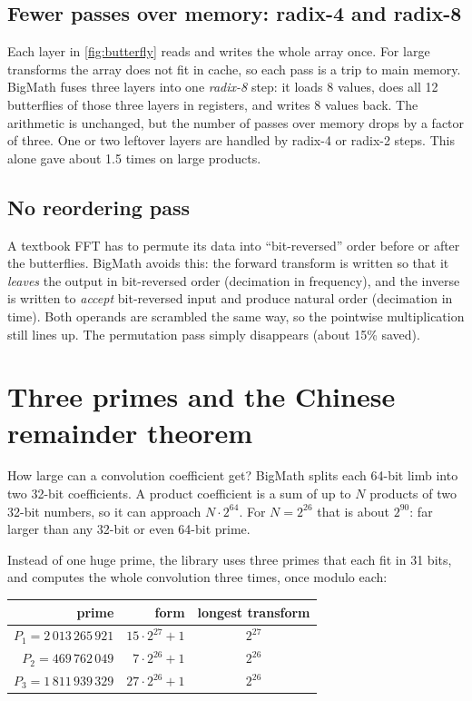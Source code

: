 \subsection{Fewer passes over memory: radix-4 and radix-8}

Each layer in \cref{fig:butterfly} reads and writes the whole array once. For large
transforms the array does not fit in cache, so each pass is a trip to main memory.
BigMath fuses three layers into one \emph{radix-8} step: it loads 8 values, does all 12
butterflies of those three layers in registers, and writes 8 values back. The arithmetic
is unchanged, but the number of passes over memory drops by a factor of three. One or two
leftover layers are handled by radix-4 or radix-2 steps. This alone gave about 1.5 times
on large products.

\subsection{No reordering pass}

A textbook FFT has to permute its data into ``bit-reversed'' order before or after the
butterflies. BigMath avoids this: the forward transform is written so that it
\emph{leaves} the output in bit-reversed order (decimation in frequency), and the inverse
is written to \emph{accept} bit-reversed input and produce natural order (decimation in
time). Both operands are scrambled the same way, so the pointwise multiplication still
lines up. The permutation pass simply disappears (about 15\% saved).

\section{Three primes and the Chinese remainder theorem}
\label{sec:crt}

How large can a convolution coefficient get? BigMath splits each 64-bit limb into two
32-bit coefficients. A product coefficient is a sum of up to $N$ products of two 32-bit
numbers, so it can approach $N \cdot 2^{64}$. For $N = 2^{26}$ that is about $2^{90}$: far
larger than any 32-bit or even 64-bit prime.

Instead of one huge prime, the library uses three primes that each fit in 31 bits, and
computes the whole convolution three times, once modulo each:

\begin{center}
\begin{tabular}{rrc}
\toprule
prime & form & longest transform \\
\midrule
$P_1 = 2\,013\,265\,921$ & $15 \cdot 2^{27} + 1$ & $2^{27}$ \\
$P_2 = 469\,762\,049$ & $7 \cdot 2^{26} + 1$ & $2^{26}$ \\
$P_3 = 1\,811\,939\,329$ & $27 \cdot 2^{26} + 1$ & $2^{26}$ \\
\bottomrule
\end{tabular}
\end{center}

